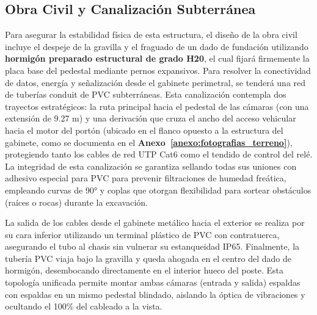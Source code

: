 \subsection{Obra Civil y Canalización Subterránea}

Para asegurar la estabilidad física de esta estructura, el diseño de la obra civil incluye el despeje de la gravilla y el fraguado de un dado de fundación utilizando \textbf{hormigón preparado estructural de grado H20}, el cual fijará firmemente la placa base del pedestal mediante pernos expansivos. Para resolver la conectividad de datos, energía y señalización desde el gabinete perimetral, se tenderá una red de tuberías conduit de PVC subterráneas. Esta canalización contempla dos trayectos estratégicos: la ruta principal hacia el pedestal de las cámaras (con una extensión de 9.27 m) y una derivación que cruza el ancho del acceso vehicular hacia el motor del portón (ubicado en el flanco opuesto a la estructura del gabinete, como se documenta en el \textbf{Anexo~\ref{anexo:fotografias_terreno}}), protegiendo tanto los cables de red UTP Cat6 como el tendido de control del relé. La integridad de esta canalización se garantiza sellando todas sus uniones con adhesivo especial para PVC para prevenir filtraciones de humedad freática, empleando curvas de 90° y coplas que otorgan flexibilidad para sortear obstáculos (raíces o rocas) durante la excavación. 

La salida de los cables desde el gabinete metálico hacia el exterior se realiza por su cara inferior utilizando un terminal plástico de PVC con contratuerca, asegurando el tubo al chasis sin vulnerar su estanqueidad IP65. Finalmente, la tubería PVC viaja bajo la gravilla y queda ahogada en el centro del dado de hormigón, desembocando directamente en el interior hueco del poste. Esta topología unificada permite montar ambas cámaras (entrada y salida) espaldas con espaldas en un mismo pedestal blindado, aislando la óptica de vibraciones y ocultando el 100\% del cableado a la vista.
